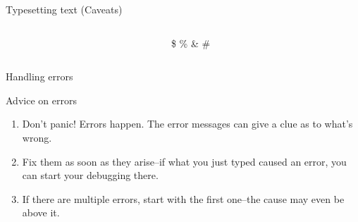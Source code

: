 \documentclass[,aspectratio=43]{beamer}
\newcommand{\VERB}{\Verb[commandchars=\\\{\}]}
\newenvironment{Shaded}{\begin{snugshade}}{\end{snugshade}}
\newcommand{\FunctionTok}[1]{\textcolor[rgb]{0.02,0.16,0.49}{#1}}
\begin{document}
\begin{frame}[fragile]{Typesetting text (Caveats)}
\begin{columns}[T]
\begin{column}{0.48\textwidth}
\vspace{-1em}

\begin{Shaded}
\begin{Highlighting}[]
\FunctionTok{\textbackslash{}$} \FunctionTok{\textbackslash{}\%} \FunctionTok{\textbackslash{}\&} \FunctionTok{\textbackslash{}\#} 
\end{Highlighting}
\end{Shaded}
\end{column}

\begin{column}{0.48\textwidth}
\$ \% \& \#
\end{column}
\end{columns}
\end{frame}

\begin{frame}[fragile]{Handling errors}
\protect\hypertarget{handling-errors}{}

\begin{block}{Advice on errors}

\begin{enumerate}
\item
  Don't panic! Errors happen. The error messages can give a clue as to
  what's wrong.
\item
  Fix them as soon as they arise--if what you just typed caused an
  error, you can start your debugging there.
\item
  If there are multiple errors, start with the first one--the cause may
  even be above it.
\end{enumerate}

\end{block}
\end{frame}
\end{document}
